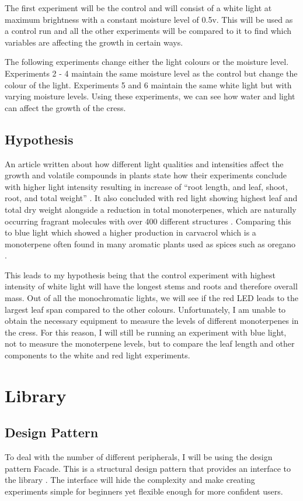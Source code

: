 The first experiment will be the control and will consist of a white light at maximum brightness with a constant moisture level of 0.5v. This will be used as a control run and all the other experiments will be compared to it to find which variables are affecting the growth in certain ways.

The following experiments change either the light colours or the moisture level. Experiments 2 - 4 maintain the same moisture level as the control but change the colour of the light. Experiments 5 and 6 maintain the same white light but with varying moisture levels. Using these experiments, we can see how water and light can affect the growth of the cress.

\subsection{Hypothesis}

An article written about how different light qualities and intensities affect the growth and volatile compounds in plants state how their experiments conclude with higher light intensity resulting in increase of “root length, and leaf, shoot, root, and total weight” \cite{bayir2019plant}. It also concluded with red light showing highest leaf and total dry weight alongside a reduction in total monoterpenes, which are naturally occurring fragrant molecules with over 400 different structures \cite{ALCANTARA2011309}. Comparing this to blue light which showed a higher production in carvacrol which is a monoterpene often found in many aromatic plants used as spices such as oregano \cite{bayir2019plant}.

This leads to my hypothesis being that the control experiment with highest intensity of white light will have the longest stems and roots and therefore overall mass. Out of all the monochromatic lights, we will see if the red LED leads to the largest leaf span compared to the other colours. Unfortunately, I am unable to obtain the necessary equipment to measure the levels of different monoterpenes in the cress. For this reason, I will still be running an experiment with blue light, not to measure the monoterpene levels, but to compare the leaf length and other components to the white and red light experiments.

\section{Library}

\subsection{Design Pattern}
To deal with the number of different peripherals, I will be using the design pattern Facade. This is a structural design pattern that provides an interface to the library \cite{designPatterns}. The interface will hide the complexity and make creating experiments simple for beginners yet flexible enough for more confident users.


